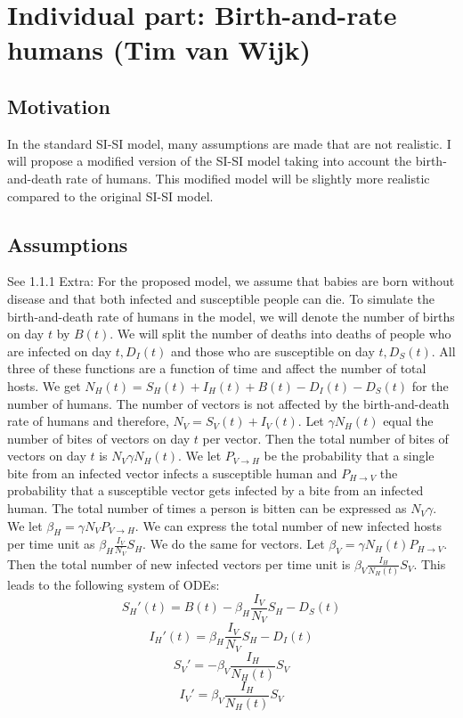 \section{Individual part: Birth-and-rate humans (Tim van Wijk)}

\subsection{Motivation}
In the standard SI-SI model, many assumptions are made that are not realistic. I will propose a modified version of the SI-SI model taking into account the birth-and-death rate of humans. This modified model will be slightly more realistic compared to the original SI-SI model.

\subsection{Assumptions}
See 1.1.1
Extra:
For the proposed model, we assume that babies are born without disease and that both infected and susceptible people can die. To simulate the birth-and-death rate of humans in the model, we will denote the number of births on day $t$ by $B(t)$. We will split the number of deaths into deaths of people who are infected on day $t, D_I(t)$ and those who are susceptible on day $t, D_S(t)$. All three of these functions are a function of time and affect the number of total hosts. We get $N_H(t)=S_H(t) + I_H(t) + B(t)-D_I(t) -D_S(t)$ for the number of humans. The number of vectors is not affected by the birth-and-death rate of humans and therefore, $N_V = S_V(t) + I_V(t)$. Let $\gamma N_H(t)$ equal the number of bites of vectors on day $t$ per vector. Then the total number of bites of vectors on day $t$ is $N_V \gamma N_H(t)$. We let $P_{V\rightarrow H}$ be the probability that a single bite from an infected vector infects a susceptible human and $P_{H\rightarrow V}$ the probability that a susceptible vector gets infected by a bite from an infected human. The total number of times a person is bitten can be expressed as $N_V \gamma$.  We let $\beta_H = \gamma N_V P_{V\rightarrow H}$. We can express the total number of new infected hosts per time unit as $\beta_H \frac{I_V}{N_V} S_H$. We do the same for vectors. Let $\beta_V = \gamma N_H(t) P_{H\rightarrow V}$. Then the total number of new infected vectors per time unit is $\beta_V \frac{I_H}{N_H(t)} S_V$. This leads to the following system of ODEs:
\begin{equation}
S_H'(t) = B(t) -\beta_H \frac{I_V}{N_V} S_H - D_S(t) 
\end{equation}
\begin{equation}
I_H'(t) = \beta_H \frac{I_V}{N_V} S_H - D_I(t)
\end{equation}
\begin{equation}
S_V' = -\beta_V \frac{I_H}{N_H(t)} S_V
\end{equation}
\begin{equation}
I_V' = \beta_V \frac{I_H}{N_H(t)} S_V
\end{equation}